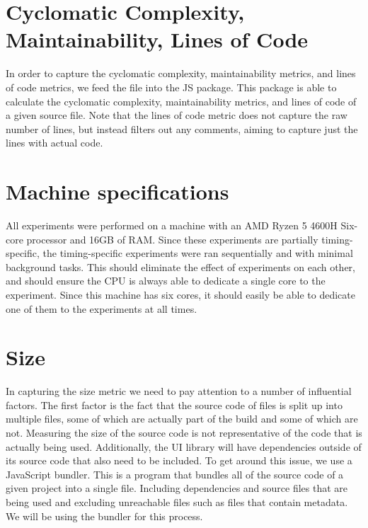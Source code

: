 \section{Cyclomatic Complexity, Maintainability, Lines of Code}
In order to capture the cyclomatic complexity, maintainability metrics, and lines of code metrics, we feed the file into the  JS package. This package is able to calculate the cyclomatic complexity, maintainability metrics, and lines of code of a given source file. Note that the lines of code metric does not capture the raw number of lines, but instead filters out any comments, aiming to capture just the lines with actual code.

\section{Machine specifications}\label{sec:experimental-setup:machine-specs}
All experiments were performed on a machine with an AMD Ryzen 5 4600H Six-core processor and 16GB of RAM. Since these experiments are partially timing-specific, the timing-specific experiments were ran sequentially and with minimal background tasks. This should eliminate the effect of experiments on each other, and should ensure the CPU is always able to dedicate a single core to the experiment. Since this machine has six cores, it should easily be able to dedicate one of them to the experiments at all times.

\section{Size}\label{sec:experimental-setup:size}
In capturing the size metric we need to pay attention to a number of influential factors. The first factor is the fact that the source code of files is split up into multiple files, some of which are actually part of the build and some of which are not. Measuring the size of the source code is not representative of the code that is actually being used. Additionally, the UI library will have dependencies outside of its source code that also need to be included. To get around this issue, we use a JavaScript bundler. This is a program that bundles all of the source code of a given project into a single file. Including dependencies and source files that are being used and excluding unreachable files such as files that contain metadata. We will be using the  bundler for this process.

